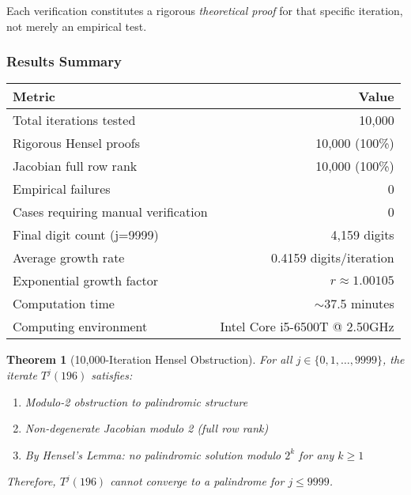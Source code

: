 \documentclass[12pt,a4paper]{article}
\newtheorem{theorem}{Theorem}[section]
\begin{document}
Each verification constitutes a rigorous \textit{theoretical proof} for 
that specific iteration, not merely an empirical test.

\subsubsection{Results Summary}

\begin{center}
\begin{tabular}{@{}l r@{}}
	\toprule
	\textbf{Metric} & \textbf{Value} \\
\midrule
Total iterations tested & 10,000 \\
Rigorous Hensel proofs & 10,000 (100\%) \\
Jacobian full row rank & 10,000 (100\%) \\
Empirical failures & 0 \\
Cases requiring manual verification & 0 \\
\midrule
Final digit count (j=9999) & 4,159 digits \\
Average growth rate & 0.4159 digits/iteration \\
Exponential growth factor & $r \approx 1.00105$ \\
\midrule
Computation time & $\sim$37.5 minutes \\
Computing environment & Intel Core i5-6500T @ 2.50GHz \\
\bottomrule
\end{tabular}
\end{center}

\begin{theorem}[10,000-Iteration Hensel Obstruction]\label{thm:196_trajectory_proven_10k}
For all $j \in \{0, 1, \ldots, 9999\}$, the iterate $T^j(196)$ satisfies:
\begin{enumerate}
\item Modulo-2 obstruction to palindromic structure
\item Non-degenerate Jacobian modulo 2 (full row rank)
\item By Hensel's Lemma: no palindromic solution modulo $2^k$ for any $k \geq 1$
\end{enumerate}
Therefore, $T^j(196)$ cannot converge to a palindrome for $j \leq 9999$.
\end{theorem}
\end{document}
